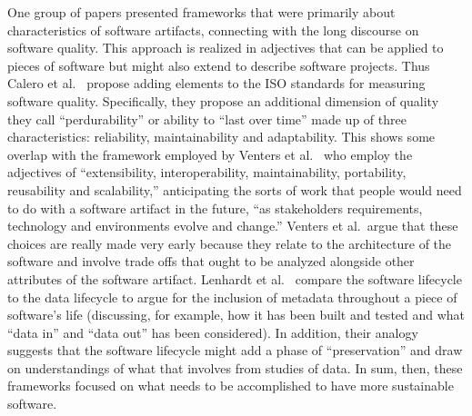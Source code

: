 \documentclass[11pt, oneside]{amsart}
\begin{document}
One group of papers presented frameworks that were primarily about
characteristics of software artifacts, connecting with the long
discourse on software quality. This approach is realized in adjectives
that can be applied to pieces of software but might also extend to
describe software projects.  Thus Calero et al.~\cite{Calero_WSSSPE}
propose adding elements to the ISO standards for measuring software
quality. Specifically, they propose an additional dimension of quality
they call ``perdurability'' or ability to ``last over time'' made up
of three characteristics: reliability, maintainability and
adaptability. This shows some overlap with the framework employed by
Venters et al.~\cite{Venters_WSSSPE} who employ the adjectives of
``extensibility, interoperability, maintainability, portability,
reusability and scalability,'' anticipating the sorts of work that
people would need to do with a software artifact in the future, ``as
stakeholders requirements, technology and environments evolve and
change.'' Venters et al.~argue that these choices are really made very
early because they relate to the architecture of the software and
involve trade offs that ought to be analyzed alongside other
attributes of the software artifact. Lenhardt et
al.~\cite{Lenhardt_WSSSPE} compare the software lifecycle to the data
lifecycle to argue for the inclusion of metadata throughout a piece of
software's life (discussing, for example, how it has been built and
tested and what ``data in'' and ``data out'' has been considered). In
addition, their analogy suggests that the software lifecycle might add
a phase of ``preservation'' and draw on understandings of what that
involves from studies of data.  In sum, then, these frameworks focused
on what needs to be accomplished to have more sustainable software.
\end{document}
